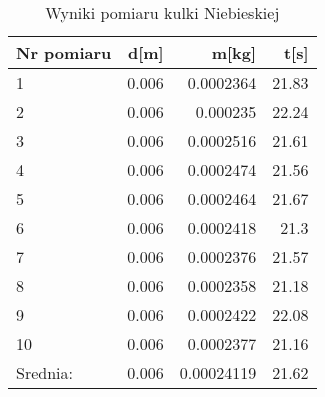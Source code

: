 \documentclass{article}
\begin{document}
\begin{center}
    \begin{table}[h]    
        \caption{Wyniki pomiaru kulki Niebieskiej}
        \centering
        \begin{tabular}{|l|r|r|r|}
            \hline
            Nr pomiaru & d[m] & m[kg] & t[s] \\ \hline
            1 & 0.006 & 0.0002364 & 21.83 \\ \hline
            2 & 0.006 & 0.000235  & 22.24 \\ \hline
            3 & 0.006 & 0.0002516 & 21.61 \\ \hline
            4 & 0.006 & 0.0002474 & 21.56 \\ \hline
            5 & 0.006 & 0.0002464 & 21.67 \\ \hline
            6 & 0.006 & 0.0002418 & 21.3  \\ \hline
            7 & 0.006 & 0.0002376 & 21.57 \\ \hline
            8 & 0.006 & 0.0002358 & 21.18 \\ \hline
            9 & 0.006 & 0.0002422 & 22.08 \\ \hline
            10& 0.006 & 0.0002377 & 21.16 \\ \hline
            Srednia: & 0.006 & 0.00024119 & 21.62 \\ \hline
        \end{tabular}%
        \label{tab:Tabela Pomiarow Kulki Niebieskiej}%
    \end{table}%
\end{center}
\newpage

\end{document}

